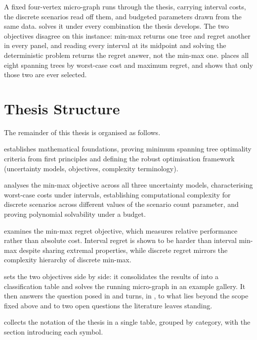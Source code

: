 A fixed four-vertex micro-graph runs through the thesis, carrying interval costs, the discrete scenarios read off them, and budgeted parameters drawn from the same data.
 solves it under every combination the thesis develops.
The two objectives disagree on this instance: min-max returns one tree and regret another in every panel, and reading every interval at its midpoint and solving the deterministic problem returns the regret answer, not the min-max one.
 places all eight spanning trees by worst-case cost and maximum regret, and shows that only those two are ever selected.

\section{Thesis Structure}\label{sec:intro-structure}

The remainder of this thesis is organised as follows.

 establishes mathematical foundations, proving minimum spanning tree optimality criteria from first principles and defining the robust optimisation framework (uncertainty models, objectives, complexity terminology).

 analyses the min-max objective across all three uncertainty models, characterising worst-case costs under intervals, establishing computational complexity for discrete scenarios across different values of the scenario count parameter, and proving polynomial solvability under a budget.

 examines the min-max regret objective, which measures relative performance rather than absolute cost.
Interval regret is shown to be harder than interval min-max despite sharing extremal properties, while discrete regret mirrors the complexity hierarchy of discrete min-max.

 sets the two objectives side by side: it consolidates the results of  into a classification table and solves the running micro-graph in an example gallery.
It then answers the question posed in  and turns, in , to what lies beyond the scope fixed above and to two open questions the literature leaves standing.

 collects the notation of the thesis in a single table, grouped by category, with the section introducing each symbol.